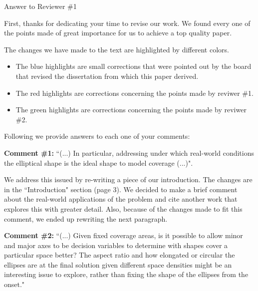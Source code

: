 \documentclass[letterpaper]{letter}
\begin{document}
	
		
		\begin{letter}{}

		\opening{Answer to Reviewer \#1}
		
		First, thanks for dedicating your time to revise our work. We found every one of the points made of great importance for us to achieve a top quality paper.
		
		The changes we have made to the text are highlighted by different colors. 
		\begin{itemize}
			\item The {\color{blue} blue} highlights are small corrections that were pointed out by the board that revised the dissertation from which this paper derived.
			
			\item The {\color{Red} red} highlights are corrections concerning the points made by reviwer \#1.
			
			\item The {\color{Green} green} highlights are corrections concerning the points made by reviwer \#2.
		\end{itemize}
		 
		Following we provide answers to each one of your comments:
		
		\textbf{Comment \#1:} ``(...) In particular, addressing under which real-world conditions the elliptical shape is the ideal shape to model coverage (...)".
		
		We address this issued by re-writing a piece of our introduction. The changes are in the ``Introduction" section (page 3). We decided to make a brief comment about the real-world applications of the problem and cite another work that explores this with greater detail. Also, because of the changes made to fit this comment, we ended up rewriting the next paragraph.
		
		\textbf{Comment \#2:} ``(...) Given fixed coverage areas, is it possible to allow minor and major axes to be decision variables to determine with shapes cover a particular space better? The aspect ratio and how elongated or circular the ellipses are at the final solution given different space densities might be an interesting issue to explore, rather than fixing the shape of the ellipses from the onset."
		

\end{letter}
\end{document}
